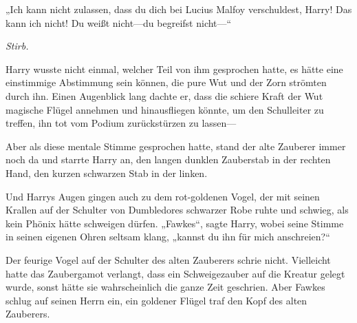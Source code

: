„Ich kann nicht zulassen, dass du dich bei Lucius Malfoy verschuldest, Harry! Das kann ich nicht! Du weißt nicht—du begreifst nicht—“

\emph{Stirb.}

Harry wusste nicht einmal, welcher Teil von ihm gesprochen hatte, es hätte eine einstimmige Abstimmung sein können, die pure Wut und der Zorn strömten durch ihn. Einen Augenblick lang dachte er, dass die schiere Kraft der Wut magische Flügel annehmen und hinausfliegen könnte, um den Schulleiter zu treffen, ihn tot vom Podium zurückstürzen zu lassen—

Aber als diese mentale Stimme gesprochen hatte, stand der alte Zauberer immer noch da und starrte Harry an, den langen dunklen Zauberstab in der rechten Hand, den kurzen schwarzen Stab in der linken.

Und Harrys Augen gingen auch zu dem rot-goldenen Vogel, der mit seinen Krallen auf der Schulter von Dumbledores schwarzer Robe ruhte und schwieg, als kein Phönix hätte schweigen dürfen.
„Fawkes“, sagte Harry, wobei seine Stimme in seinen eigenen Ohren seltsam klang, „kannst du ihn für mich anschreien?“

Der feurige Vogel auf der Schulter des alten Zauberers schrie nicht. Vielleicht hatte das Zaubergamot verlangt, dass ein Schweigezauber auf die Kreatur gelegt wurde, sonst hätte sie wahrscheinlich die ganze Zeit geschrien. Aber Fawkes schlug auf seinen Herrn ein, ein goldener Flügel traf den Kopf des alten Zauberers.

